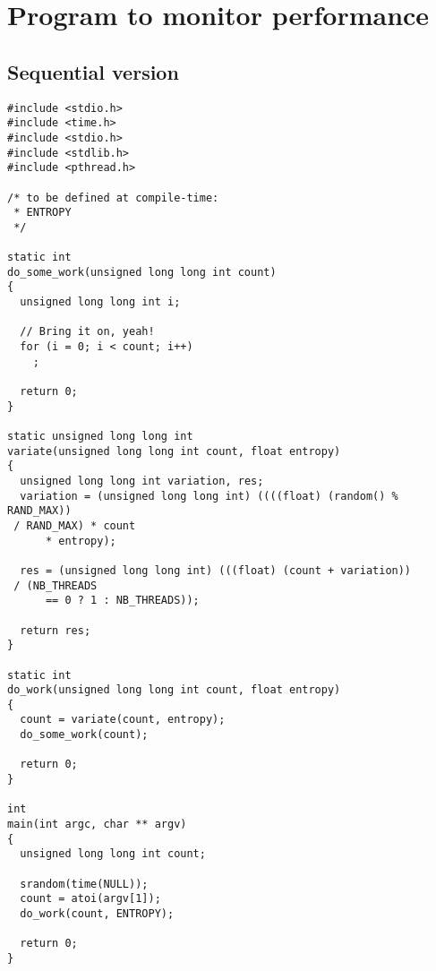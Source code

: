 \clearpage
\appendix
\section{Program to monitor performance}
\label{sec:files}
\subsection{Sequential version}
\label{app:sequential}
\begin{lstlisting}
#include <stdio.h>
#include <time.h>
#include <stdio.h>
#include <stdlib.h>
#include <pthread.h>

/* to be defined at compile-time:
 * ENTROPY
 */

static int
do_some_work(unsigned long long int count)
{
  unsigned long long int i;

  // Bring it on, yeah!
  for (i = 0; i < count; i++)
    ;

  return 0;
}

static unsigned long long int
variate(unsigned long long int count, float entropy)
{
  unsigned long long int variation, res;
  variation = (unsigned long long int) ((((float) (random() % RAND_MAX))
 / RAND_MAX) * count
      * entropy);

  res = (unsigned long long int) (((float) (count + variation))
 / (NB_THREADS
      == 0 ? 1 : NB_THREADS));

  return res;
}

static int
do_work(unsigned long long int count, float entropy)
{
  count = variate(count, entropy);
  do_some_work(count);

  return 0;
}

int
main(int argc, char ** argv)
{
  unsigned long long int count;

  srandom(time(NULL));
  count = atoi(argv[1]);
  do_work(count, ENTROPY);

  return 0;
}
\end{lstlisting}
